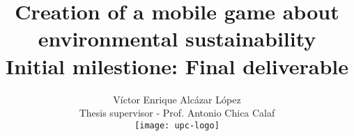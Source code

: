 

\title{Creation of a mobile game about environmental sustainability \\
 \large Initial milestione: Final deliverable}

\author{Víctor Enrique Alcázar López \\
	Thesis supervisor - Prof. Antonio Chica Calaf \\
	\texttt{[image: upc-logo]}
}




\maketitle
\tableofcontents












\printglossary[type=\acronymtype]
\printglossary





